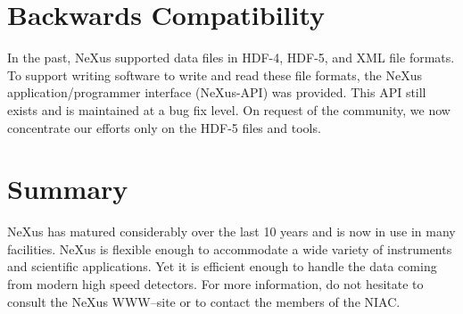 \documentclass[%
 aip,
rsi,
 amsmath,amssymb,
 reprint,%
]{revtex4-1}
\begin{document}
\section{Backwards Compatibility}

In the past, NeXus supported data files in HDF-4, HDF-5, and XML file formats. 
To support writing software to write and read these file formats, the NeXus
application/programmer interface (NeXus-API) was provided.
This API still exists and is maintained at a bug fix level.
On request of the community, we now concentrate our efforts only
on the HDF-5 files and tools.

\section{Summary}

NeXus has matured considerably over the last 10 years and is now in use in many facilities. NeXus 
is flexible enough to accommodate a wide variety of instruments and scientific applications. 
Yet it is efficient enough to 
handle the data coming from modern high speed detectors. For more information,
do not hesitate to consult the NeXus WWW--site\cite{nxwww} or to contact
the members of the NIAC. 



\nocite{*}
\end{document}

